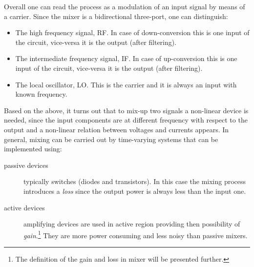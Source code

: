 Overall one can read the process as a modulation of an input signal by means of a carrier.  Since the mixer is a bidirectional three-port, one can distinguish: 
\begin{itemize}
	\item The high frequency signal, RF. In case of down-conversion this is one input of the circuit, vice-versa it is the output (after filtering).
	\item The intermediate frequency signal, IF. In case of up-conversion this is one input of the circuit, vice-versa it is the output (after filtering).
	\item The local oscillator, LO. This is the carrier and it is always an input with known frequency.
\end{itemize}

Based on the above, it turns out that to mix-up two signals a non-linear device is needed, since the input components are at different frequency with respect to the output and a non-linear relation between voltages and currents appears. In general, mixing can be carried out by time-varying systems that can be implemented using:
\begin{description}
	\item [passive devices]	typically switches (diodes and transistors). In this case the mixing process introduces a \emph{loss} since the output power is always less than the input one.
	\item [active devices] amplifying devices are used in active region providing then possibility of \emph{gain}.\footnote{The definition of the gain and loss in mixer will be presented further.} They are more power consuming and less noisy than passive mixers.
\end{description}

